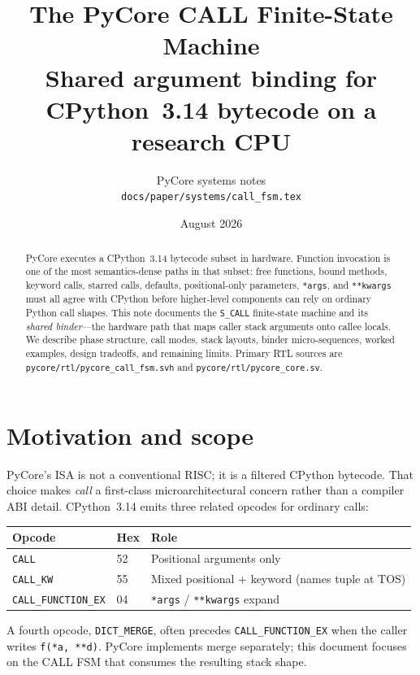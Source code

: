 \documentclass[11pt,a4paper]{article}
\title{The PyCore CALL Finite-State Machine\\
\large Shared argument binding for CPython~3.14 bytecode on a research CPU}
\author{PyCore systems notes\\
\texttt{docs/paper/systems/call\_fsm.tex}}
\date{August 2026}
\begin{document}
\maketitle

\begin{abstract}
PyCore executes a CPython~3.14 bytecode subset in hardware.
Function invocation is one of the most semantics-dense paths in that subset:
free functions, bound methods, keyword calls, starred calls, defaults,
positional-only parameters, \texttt{*args}, and \texttt{**kwargs} must all
agree with CPython before higher-level components can rely on ordinary Python
call shapes.
This note documents the \texttt{S\_CALL} finite-state machine and its
\emph{shared binder}---the hardware path that maps caller stack arguments onto
callee locals.
We describe phase structure, call modes, stack layouts, binder micro-sequences,
worked examples, design tradeoffs, and remaining limits.
Primary RTL sources are \texttt{pycore/rtl/pycore\_call\_fsm.svh} and
\texttt{pycore/rtl/pycore\_core.sv}.
\end{abstract}

\tableofcontents
\newpage

\section{Motivation and scope}

PyCore's ISA is not a conventional RISC; it is a filtered CPython bytecode.
That choice makes \emph{call} a first-class microarchitectural concern rather
than a compiler ABI detail.
CPython~3.14 emits three related opcodes for ordinary calls:

\begin{center}
\begin{tabular}{@{}llp{}@{}}
\toprule
Opcode & Hex & Role \\
\midrule
\texttt{CALL} & 52 & Positional arguments only \\
\texttt{CALL\_KW} & 55 & Mixed positional + keyword (names tuple at TOS) \\
\texttt{CALL\_FUNCTION\_EX} & 04 & \texttt{*args} / \texttt{**kwargs} expand \\
\bottomrule
\end{tabular}
\end{center}

A fourth opcode, \texttt{DICT\_MERGE}, often precedes \texttt{CALL\_FUNCTION\_EX}
when the caller writes \texttt{f(*a, **d)}.
PyCore implements merge separately; this document focuses on the CALL FSM that
consumes the resulting stack shape.
\end{document}
